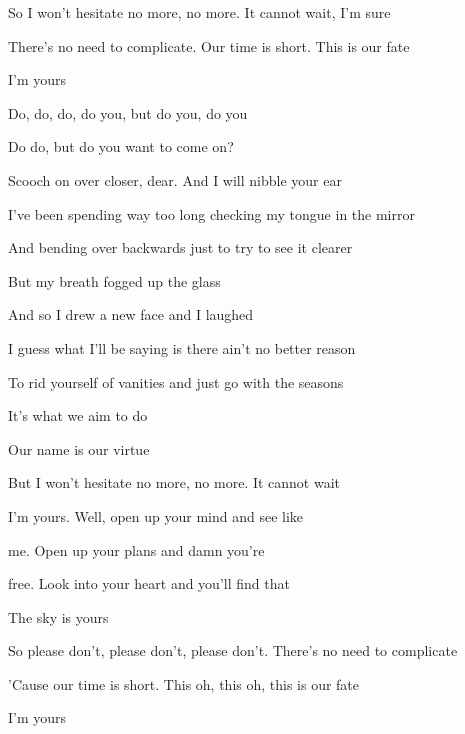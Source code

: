 \begin{song}
So I won't hesitate no more, no more. It cannot wait, I'm sure \par
There's no need to complicate. Our time is short. This is our fate \par
I'm yours \par

\bigskip

Do, do, do, do you,  but do you, do you  \par
Do do, but do you want to come on?  \par
Scooch on over closer, dear. And I will nibble your ear \par

\bigskip

      \par


\bigskip

I've been spending way too long checking my tongue in the mirror \par
And bending over backwards just to try to see it clearer \par
But my breath fogged up the glass \par
And so I drew a new face and I laughed \par
I guess what I'll be saying is there ain't no better reason \par
To rid yourself of vanities and just go with the seasons \par
It's what we aim to do \par
Our name is our virtue \par

\bigskip

But I won't hesitate no more, no more. It cannot wait \par

\bigskip

I'm yours. Well, open up your mind and see like \par
{}me. Open up your plans and damn you're \par
{}free. Look into your heart and you'll find that \par
{} The sky is yours \par
So please don't, please don't, please don't. There's no need to complicate \par
'Cause our time is short. This oh, this oh, this is our fate \par
I'm yours \par

\end{song}